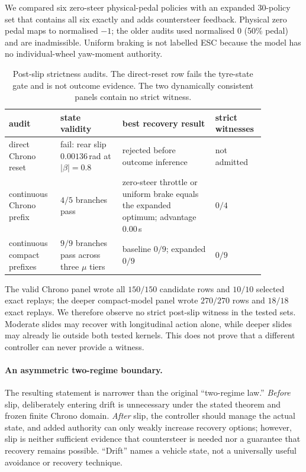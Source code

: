 \documentclass[11pt]{article}
\begin{document}
We compared six zero-steer physical-pedal policies with an expanded 30-policy set that contains all
six exactly and adds countersteer feedback. Physical zero pedal maps to normalised $-1$; the older
audits used normalised $0$ (50\% pedal) and are inadmissible. Uniform braking is not labelled ESC
because the model has no individual-wheel yaw-moment authority.

\begin{table}[H]
\centering
\small
\caption{Post-slip strictness audits. The direct-reset row fails the tyre-state gate and is not
outcome evidence. The two dynamically consistent panels contain no strict witness.}
\label{tab:postslip-audits}
\begin{tabular}{@{}L{0.18\linewidth}L{0.22\linewidth}L{0.33\linewidth}L{0.13\linewidth}@{}}
\toprule
audit & state validity & best recovery result & strict witnesses \\
\midrule
direct Chrono reset & fail: rear slip $0.00136$\,rad at $|\beta|=0.8$ & rejected before outcome
inference & not admitted \\
continuous Chrono prefix & $4/5$ branches pass & zero-steer throttle or uniform brake equals the
expanded optimum; advantage $0.00$\,s & $0/4$ \\
continuous compact prefixes & $9/9$ branches pass across three $\mu$ tiers & baseline $0/9$;
expanded $0/9$ & $0/9$ \\
\bottomrule
\end{tabular}
\end{table}

The valid Chrono panel wrote all $150/150$ candidate rows and $10/10$ selected exact replays; the
deeper compact-model panel wrote $270/270$ rows and $18/18$ exact replays. We therefore observe no
strict post-slip witness in the tested sets. Moderate slides may recover with longitudinal action
alone, while deeper slides may already lie outside both tested kernels. This does not prove that a
different controller can never provide a witness.

\paragraph{An asymmetric two-regime boundary.}
The resulting statement is narrower than the original ``two-regime law.'' \emph{Before} slip,
deliberately entering drift is unnecessary under the stated theorem and frozen finite Chrono domain.
\emph{After} slip, the controller should manage the actual state, and added authority can only weakly
increase recovery options; however, slip is neither sufficient evidence that countersteer is needed
nor a guarantee that recovery remains possible. ``Drift'' names a vehicle state, not a universally
useful avoidance or recovery technique.
\end{document}
